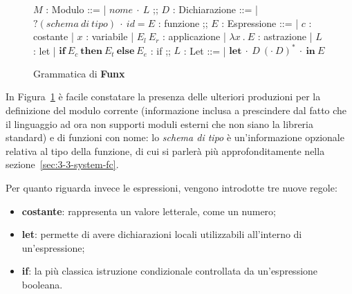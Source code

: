 \newpage

\begin{figure}
    \begin{bnf}
        $M$ : \small{Modulo} ::=
        | $nome\ \cdot\ L$
        ;;
        $D$ : \small{Dichiarazione} ::=
        | $?(schema\ di\ tipo)\ \cdot\ id = E$ : \small{funzione}
        ;;
        $E$ : \small{Espressione} ::=
        | $c$ : \small{costante}
        | $x$ : \small{variabile}
        | $E_l\ E_r$ : \small{applicazione}
        | $\lambda x\ .\ E$ : \small{astrazione}
        | $L$ : \small{let}
        | $\textbf{if}\ E_c\ \textbf{then}\ E_t\ \textbf{else}\ E_e$ : \small{if}
        ;;
        $L$ : \small{Let} ::=
        | $\textbf{let}\ \cdot\ D\ (\cdot\ D)^*\ \cdot\ \textbf{in}\ E$
    \end{bnf}
    \caption{Grammatica di \textbf{Funx}}
    \label{fig:2-3-funx-syntax}
    \vspace{4mm}
\end{figure}

\noindent In Figura~\ref{fig:2-3-funx-syntax} è facile constatare la presenza delle ulteriori produzioni per la definizione
del modulo corrente (informazione inclusa a prescindere dal fatto che il linguaggio ad ora non supporti moduli esterni
che non siano la libreria standard) e di funzioni con nome: lo \textit{schema di tipo} è un'informazione opzionale
relativa al tipo della funzione, di cui si parlerà più approfonditamente nella sezione~\ref{sec:3-3-system-fc}.

\noindent Per quanto riguarda invece le espressioni, vengono introdotte tre nuove regole:
\begin{itemize}
    \item \textbf{costante}: rappresenta un valore letterale, come un numero;
    \item \textbf{let}: permette di avere dichiarazioni locali utilizzabili all'interno di un'espressione;
    \item \textbf{if}: la più classica istruzione condizionale controllata da un'espressione booleana.
\end{itemize}

